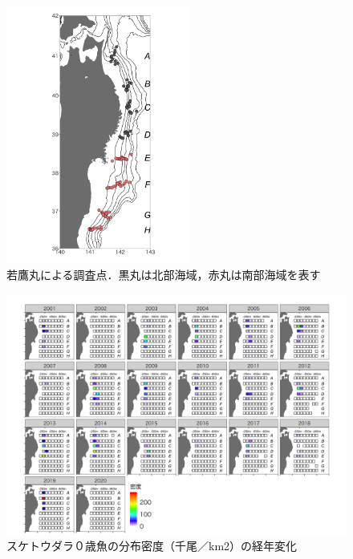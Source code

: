 \documentclass[11pt]{article} %
\begin{document}
\begin{linenumbers}
\begin{figure}[h]
  \centering
  \includegraphics[width = 6cm]{fig1.png}
  \caption{若鷹丸による調査点．黒丸は北部海域，赤丸は南部海域を表す}
\end{figure}

\begin{figure}[h]
  \centering
  \includegraphics[width = 14cm]{スケトウダラ０＋dens.png}
  \caption{スケトウダラ０歳魚の分布密度（千尾／km2）の経年変化}
\end{figure}


\end{linenumbers}
\end{document}
